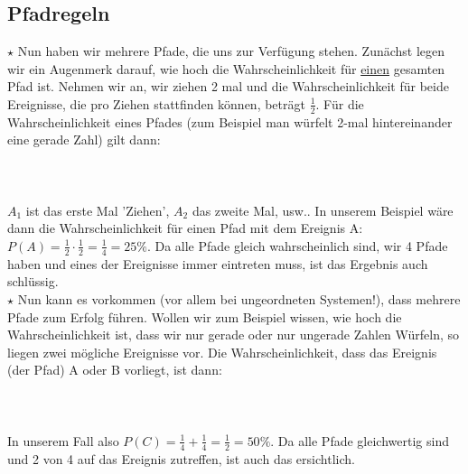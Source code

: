 	\subsection{Pfadregeln}
		\(\star\) Nun haben wir mehrere Pfade, die uns zur Verfügung stehen. Zunächst
		legen wir ein Augenmerk darauf, wie hoch die Wahrscheinlichkeit für
		\underline{einen} gesamten Pfad ist. Nehmen wir an, wir ziehen 2 mal und die
		Wahrscheinlichkeit für beide Ereignisse, die pro Ziehen stattfinden können,
		beträgt \(\frac{1}{2}\). Für die Wahrscheinlichkeit eines Pfades (zum Beispiel
		man würfelt 2-mal hintereinander eine gerade Zahl) gilt dann:
		\\ \\
		\formel{\[P(A)=P(A_1) \cdot P(A_2) \cdot \ldots\]}
		\\ \\
		\(A_1\) ist das erste Mal 'Ziehen', \(A_2\) das zweite Mal, usw.. In unserem
		Beispiel wäre dann die Wahrscheinlichkeit für einen Pfad mit dem Ereignis A:
		\(P(A)=\frac{1}{2} \cdot \frac{1}{2}=\frac{1}{4}=25\%\). Da alle Pfade gleich
		wahrscheinlich sind, wir 4 Pfade haben und eines der Ereignisse immer
		eintreten muss, ist das Ergebnis auch schlüssig.\\
		\(\star\) Nun kann es vorkommen (vor allem bei ungeordneten Systemen!), dass
		mehrere Pfade zum Erfolg führen. Wollen wir zum Beispiel wissen, wie hoch die
		Wahrscheinlichkeit ist, dass wir nur gerade oder nur ungerade Zahlen Würfeln,
		so liegen zwei mögliche Ereignisse vor. Die Wahrscheinlichkeit, dass das
		Ereignis (der Pfad) A oder B vorliegt, ist dann:
		\\ \\
		\formel{\[P(A\cup B)=P(A)+P(B)\]}
		\\ \\
		In unserem Fall also \(P(C)=\frac{1}{4}+\frac{1}{4}=\frac{1}{2}=50\%\). Da
		alle Pfade gleichwertig sind und 2 von 4 auf das Ereignis zutreffen, ist auch
		das ersichtlich.
		

